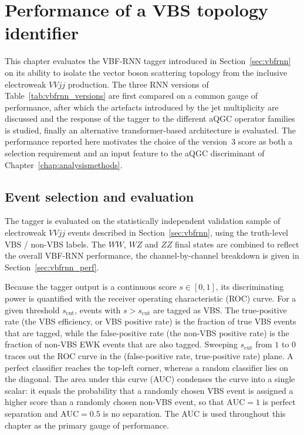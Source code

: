 \chapter{Performance of a VBS topology identifier}
\label{chap:vbfrnn_results}

This chapter evaluates the VBF-RNN tagger introduced in Section~\ref{sec:vbfrnn} on its ability to isolate the vector boson scattering topology from the inclusive electroweak $VVjj$ production. The three RNN versions of Table~\ref{tab:vbfrnn_versions} are first compared on a common gauge of performance, after which the artefacts introduced by the jet multiplicity are discussed and the response of the tagger to the different aQGC operator families is studied, finally an alternative transformer-based architecture is evaluated. The performance reported here motivates the choice of the version~3 score as both a selection requirement and an input feature to the aQGC discriminant of Chapter~\ref{chap:analysismethods}.

\section{Event selection and evaluation}
\label{sec:vbfrnn_eval}

The tagger is evaluated on the statistically independent validation sample of electroweak $VVjj$ events described in Section~\ref{sec:vbfrnn}, using the truth-level VBS / non-VBS labels. The $WW$, $WZ$ and $ZZ$ final states are combined to reflect the overall VBF-RNN performance, the channel-by-channel breakdown is given in Section~\ref{sec:vbfrnn_perf}.

Because the tagger output is a continuous score $s\in[0,1]$, its discriminating power is quantified with the receiver operating characteristic (ROC) curve. For a given threshold $s_{\mathrm{cut}}$, events with $s>s_{\mathrm{cut}}$ are tagged as VBS. The true-positive rate (the VBS efficiency, or VBS positive rate) is the fraction of true VBS events that are tagged, while the false-positive rate (the non-VBS positive rate) is the fraction of non-VBS EWK events that are also tagged. Sweeping $s_{\mathrm{cut}}$ from $1$ to $0$ traces out the ROC curve in the (false-positive rate, true-positive rate) plane. A perfect classifier reaches the top-left corner, whereas a random classifier lies on the diagonal. The area under this curve (AUC) condenses the curve into a single scalar: it equals the probability that a randomly chosen VBS event is assigned a higher score than a randomly chosen non-VBS event, so that $\mathrm{AUC}=1$ is perfect separation and $\mathrm{AUC}=0.5$ is no separation. The AUC is used throughout this chapter as the primary gauge of performance.

